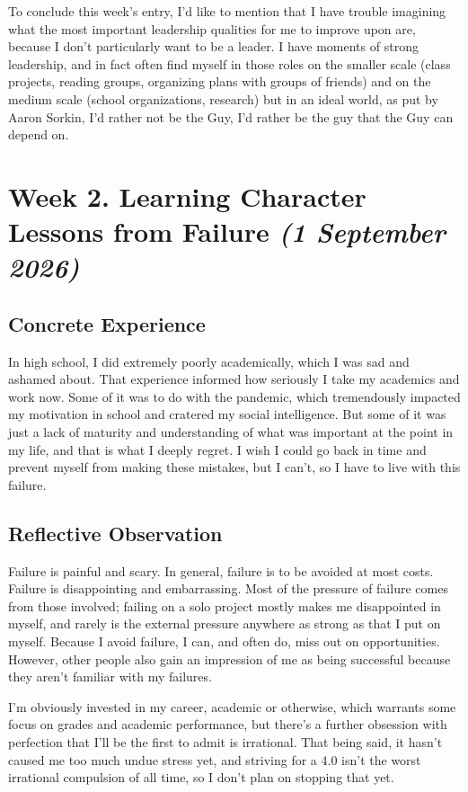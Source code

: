 \documentclass[12pt,stu,biblatex]{apa7}
\begin{document}
To conclude this week's entry, I'd like to mention that I have trouble imagining what the most important leadership qualities for me to improve upon are, because I don't particularly want to be a leader.
I have moments of strong leadership, and in fact often find myself in those roles on the smaller scale (class projects, reading groups, organizing plans with groups of friends) and on the medium scale (school organizations, research) but in an ideal world, as put by Aaron Sorkin, I'd rather not be the Guy, I'd rather be the guy that the Guy can depend on.

\section{Week 2. Learning Character Lessons from Failure \textit{(1 September 2026)}}

\subsection{Concrete Experience}
In high school, I did extremely poorly academically, which I was sad and ashamed about.
That experience informed how seriously I take my academics and work now.
Some of it was to do with the pandemic, which tremendously impacted my motivation in school and cratered my social intelligence.
But some of it was just a lack of maturity and understanding of what was important at the point in my life, and that is what I deeply regret.
I wish I could go back in time and prevent myself from making these mistakes, but I can't, so I have to live with this failure.

\subsection{Reflective Observation}
Failure is painful and scary.
In general, failure is to be avoided at most costs.
Failure is disappointing and embarrassing.
Most of the pressure of failure comes from those involved; failing on a solo project mostly makes me disappointed in myself, and rarely is the external pressure anywhere as strong as that I put on myself.
Because I avoid failure, I can, and often do, miss out on opportunities.
However, other people also gain an impression of me as being successful because they aren't familiar with my failures.

I'm obviously invested in my career, academic or otherwise, which warrants some focus on grades and academic performance, but there's a further obsession with perfection that I'll be the first to admit is irrational.
That being said, it hasn't caused me too much undue stress yet, and striving for a 4.0 isn't the worst irrational compulsion of all time, so I don't plan on stopping that yet.
\end{document}
